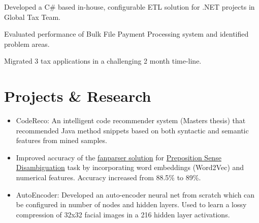 \documentclass[]{deedy-resume-openfont}
\begin{document}
\begin{minipage}[t]{0.66\textwidth}
\begin{tightemize}
\item Developed a C\# based in-house, configurable ETL solution for .NET projects in Global Tax Team.
\item Evaluated performance of Bulk File Payment Processing system and identified problem areas.
\item Migrated 3 tax applications in a challenging 2 month time-line.
\end{tightemize}
\sectionsep


\section{Projects \& Research}
\begin{itemize}
\item CodeReco: An intelligent code recommender system (Masters thesis) that recommended Java method snippets based on both syntactic and semantic features from mined samples.
\item Improved accuracy of the \href{http://www.isi.edu/publications/licensed-sw/fanseparser/}{fanparser solution} for \href{http://www.clres.com/PrepSemeval2007.html}{Preposition Sense Disambiguation} task by incorporating word embeddings (Word2Vec) and numerical features. Accuracy increased from 88.5\% to 89\%.
\item AutoEncoder: Developed an auto-encoder neural net from scratch which can be configured in number of nodes and hidden layers. Used to learn a lossy compression of 32x32 facial images in a 216 hidden layer activations.
\end{itemize}
\sectionsep


%
%

\end{minipage} 
\end{document}

